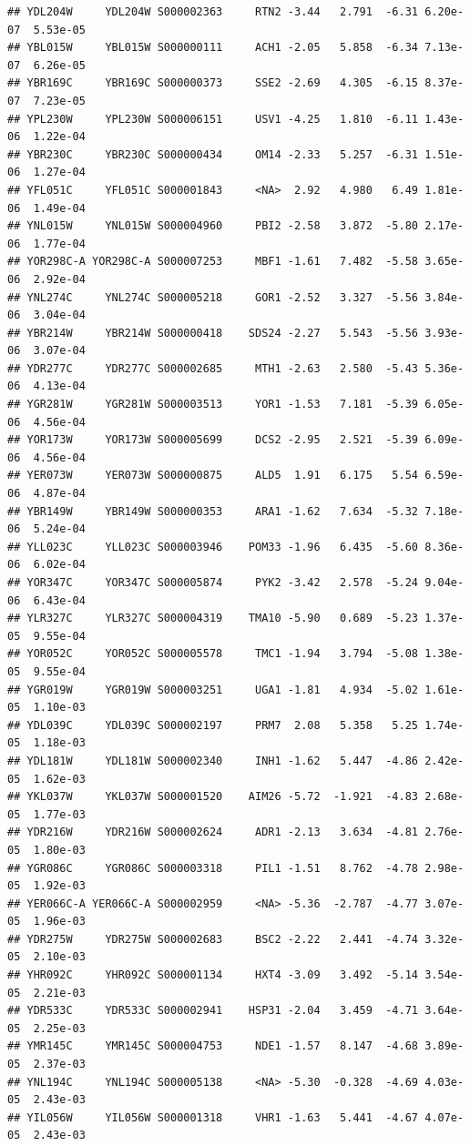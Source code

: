 \documentclass[
]{book}
\begin{document}
\begin{verbatim}
## YDL204W     YDL204W S000002363     RTN2 -3.44   2.791  -6.31 6.20e-07  5.53e-05
## YBL015W     YBL015W S000000111     ACH1 -2.05   5.858  -6.34 7.13e-07  6.26e-05
## YBR169C     YBR169C S000000373     SSE2 -2.69   4.305  -6.15 8.37e-07  7.23e-05
## YPL230W     YPL230W S000006151     USV1 -4.25   1.810  -6.11 1.43e-06  1.22e-04
## YBR230C     YBR230C S000000434     OM14 -2.33   5.257  -6.31 1.51e-06  1.27e-04
## YFL051C     YFL051C S000001843     <NA>  2.92   4.980   6.49 1.81e-06  1.49e-04
## YNL015W     YNL015W S000004960     PBI2 -2.58   3.872  -5.80 2.17e-06  1.77e-04
## YOR298C-A YOR298C-A S000007253     MBF1 -1.61   7.482  -5.58 3.65e-06  2.92e-04
## YNL274C     YNL274C S000005218     GOR1 -2.52   3.327  -5.56 3.84e-06  3.04e-04
## YBR214W     YBR214W S000000418    SDS24 -2.27   5.543  -5.56 3.93e-06  3.07e-04
## YDR277C     YDR277C S000002685     MTH1 -2.63   2.580  -5.43 5.36e-06  4.13e-04
## YGR281W     YGR281W S000003513     YOR1 -1.53   7.181  -5.39 6.05e-06  4.56e-04
## YOR173W     YOR173W S000005699     DCS2 -2.95   2.521  -5.39 6.09e-06  4.56e-04
## YER073W     YER073W S000000875     ALD5  1.91   6.175   5.54 6.59e-06  4.87e-04
## YBR149W     YBR149W S000000353     ARA1 -1.62   7.634  -5.32 7.18e-06  5.24e-04
## YLL023C     YLL023C S000003946    POM33 -1.96   6.435  -5.60 8.36e-06  6.02e-04
## YOR347C     YOR347C S000005874     PYK2 -3.42   2.578  -5.24 9.04e-06  6.43e-04
## YLR327C     YLR327C S000004319    TMA10 -5.90   0.689  -5.23 1.37e-05  9.55e-04
## YOR052C     YOR052C S000005578     TMC1 -1.94   3.794  -5.08 1.38e-05  9.55e-04
## YGR019W     YGR019W S000003251     UGA1 -1.81   4.934  -5.02 1.61e-05  1.10e-03
## YDL039C     YDL039C S000002197     PRM7  2.08   5.358   5.25 1.74e-05  1.18e-03
## YDL181W     YDL181W S000002340     INH1 -1.62   5.447  -4.86 2.42e-05  1.62e-03
## YKL037W     YKL037W S000001520    AIM26 -5.72  -1.921  -4.83 2.68e-05  1.77e-03
## YDR216W     YDR216W S000002624     ADR1 -2.13   3.634  -4.81 2.76e-05  1.80e-03
## YGR086C     YGR086C S000003318     PIL1 -1.51   8.762  -4.78 2.98e-05  1.92e-03
## YER066C-A YER066C-A S000002959     <NA> -5.36  -2.787  -4.77 3.07e-05  1.96e-03
## YDR275W     YDR275W S000002683     BSC2 -2.22   2.441  -4.74 3.32e-05  2.10e-03
## YHR092C     YHR092C S000001134     HXT4 -3.09   3.492  -5.14 3.54e-05  2.21e-03
## YDR533C     YDR533C S000002941    HSP31 -2.04   3.459  -4.71 3.64e-05  2.25e-03
## YMR145C     YMR145C S000004753     NDE1 -1.57   8.147  -4.68 3.89e-05  2.37e-03
## YNL194C     YNL194C S000005138     <NA> -5.30  -0.328  -4.69 4.03e-05  2.43e-03
## YIL056W     YIL056W S000001318     VHR1 -1.63   5.441  -4.67 4.07e-05  2.43e-03

\end{verbatim}
\end{document}

